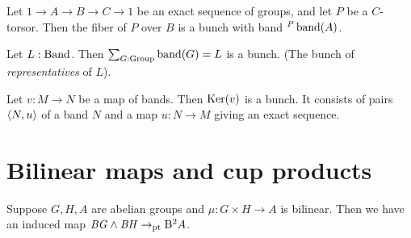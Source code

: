 \begin{definition}
  Let $1\to A\to B\to C\to 1$ be an exact sequence of groups, and let
  $P$ be a $C$-torsor. Then the fiber of $P$ over $B$ is a bunch with
  band ${}^P\band(A)$.
\end{definition}

\begin{definition}
  Let $L : \mathrm{Band}$. Then $\sum_{G:\Group}\band(G)=L$ is a bunch. (The
  bunch of \emph{representatives} of $L$).
\end{definition}

\begin{definition} %
  Let $v : M \to N$ be a map of bands. Then $\Ker(v)$ is a bunch. It
  consists of pairs $\langle N,u\rangle$ of a band $N$ and a map $u:N\to M$
  giving an exact sequence.
\end{definition}

\section{Bilinear maps and cup products}

Suppose $G,H,A$ are abelian groups and $\mu : G \times H \to A$ is bilinear.
Then we have an induced map $\mathit{B}\mathit{G} \wedge \mathit{B}\mathit{H} \to_{\mathrm{pt}} \mathrm{B}^2A$.

